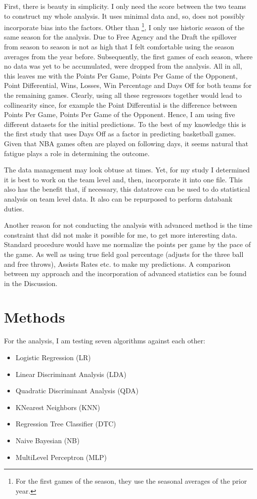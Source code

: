 \documentclass[11pt, a4paper, leqno]{article}
\begin{document}
First, there is beauty in simplicity. I only need the score between the two teams to construct my whole analysis. It uses minimal data and, so, does not possibly  incorporate bias into the factors.
Other than \cite{Zimbo}\footnote{For the first games of the season, they use the seasonal averages of the prior year.},  I only use historic season of the same season for the analysis. Due to Free Agency and the Draft the spillover from season to season is not as high that I felt comfortable using the season averages from the year before. Subsequently, the first games of each season, where no data was yet to be accumulated, were dropped from the analysis. All in all, this leaves me with the  Points Per Game, Points Per Game of the Opponent, Point Differential, Wins, Losses, Win Percentage and Days Off for both teams for the remaining games. Clearly, using all these regressors together would lead to collinearity since, for example the Point Differential is the difference between Points Per Game, Points Per Game of the Opponent. Hence, I am using five different datasets for the initial predictions. To the best of my knowledge this is the first study that uses Days Off as a factor in predicting basketball games. Given that NBA games often are played on following days, it seems natural that fatigue plays a role in determining the outcome.

The data management may look obtuse at times. Yet, for my study I determined it is best to work on the team level and, then, incorporate it into one file. This also has the benefit that, if necessary, this datatrove can be used to do statistical analysis on team level data. It also can be repurposed to perform databank duties.

Another reason for not conducting the analysis with advanced method is the time constraint that did not make it possible for me, to get more interesting data. Standard procedure would have me normalize the points per game by the pace of the game. As well as using true field goal percentage (adjusts for the three ball and free throws), Assists Rates etc. to make my predictions. A comparison between my approach and the incorporation of  advanced statistics can be found in the Discussion.

\section{Methods}

For the analysis, I am testing seven algorithms against each other: \\
\begin{itemize}
\setlength\itemsep{0.1em}
\item Logistic Regression (LR)
\item Linear Discriminant Analysis (LDA)
\item Quadratic Discriminant Analysis (QDA)
\item K\-Nearest Neighbors (KNN)
\item Regression Tree Classifier (DTC)
\item Naive Bayesian (NB)
\item Multi\-Level Perceptron (MLP)
\end{itemize}
\end{document}
